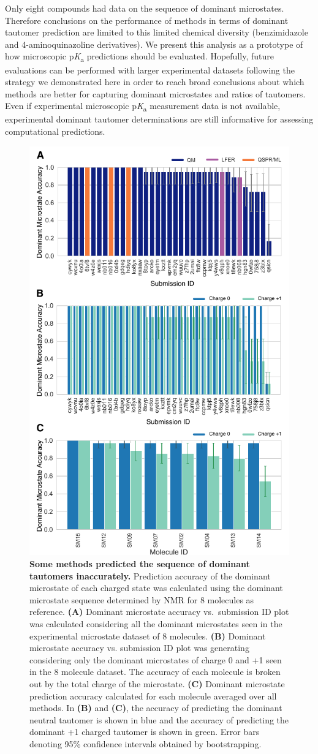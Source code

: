\documentclass[9pt,lineno,final]{elife}
\newcommand{\pKa}{p\textit{K}\textsubscript{a}}
\begin{document}
Only eight compounds had data on the sequence of dominant microstates. 
Therefore conclusions on the performance of methods in terms of dominant tautomer prediction are limited to this limited chemical diversity (benzimidazole and 4-aminoquinazoline derivatives). 
We present this analysis as a prototype of how microscopic \pKa{} predictions should be evaluated.
Hopefully, future evaluations can be performed with larger experimental datasets following the strategy we demonstrated here in order to reach broad conclusions about which methods are better for capturing dominant microstates and ratios of tautomers. 
Even if experimental microscopic \pKa{} measurement data is not available, experimental dominant tautomer determinations are still informative for assessing computational predictions.  
  

\begin{figure}[h!]
\centering
\includegraphics[width=0.5\linewidth]{figures/typeI_dominant_microstate_accuracy.pdf}
\caption{{\bf Some methods predicted the sequence of dominant tautomers inaccurately.} 
Prediction accuracy of the dominant microstate of each charged state was calculated using the dominant microstate sequence determined by NMR for 8 molecules as reference. 
{\bf(A)} Dominant microstate accuracy vs.\ submission ID plot was calculated considering all the dominant microstates seen in the experimental microstate dataset of 8 molecules. {\bf(B)} Dominant microstate accuracy vs. submission ID plot was generating considering only the dominant microstates of charge 0 and +1 seen in the 8 molecule dataset. 
The accuracy of each molecule is broken out by the total charge of the microstate. 
{\bf(C)} Dominant microstate prediction accuracy calculated for each molecule averaged over all methods. 
In {\bf(B)} and {\bf(C)}, the accuracy of predicting the dominant neutral tautomer is shown in blue and the accuracy of predicting the dominant +1 charged tautomer is shown in green. Error bars denoting 95\% confidence intervals obtained by bootstrapping.
}
\label{fig:typeI_dominant_microstate_accuracy}
\end{figure}
\end{document}
